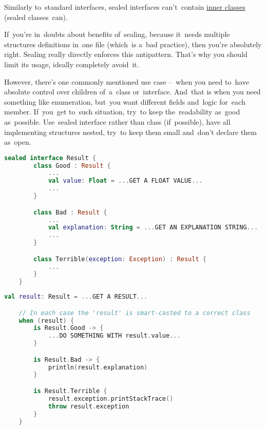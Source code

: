 \warning Similarly to~standard interfaces, sealed interfaces can't~contain \hyperref[kotlininnerclass]{inner classes} (sealed classes~can).

If~you're in~doubts about benefits of~sealing, because it~needs multiple structures definitions in~one file (which~is a~bad practice), then you're absolutely right.
Sealing really directly enforces this antipattern.
That's why you should limit its usage, ideally completely avoid~it.

However, there's one commonly mentioned use case --~when you need to~have absolute control over children of~a~class or~interface.
And~that is when you need something like enumeration, but~you want different fields and~logic for~each member.
If~you~get to~such situation, try~to keep the~readability as~good as~possible.
Use~sealed interface rather than class (if~possible), have all implementing structures nested, try~to keep them small and~don't declare them as~open.
\newpage

\example
\begin{lstlisting}[language=Kotlin, title={Sealed interface representing a~result}]
    sealed interface Result {
        class Good : Result {
            ...
            val value: Float = ...GET A FLOAT VALUE...
            ...
        }

        class Bad : Result {
            ...
            val explanation: String = ...GET AN EXPLANATION STRING...
            ...
        }

        class Terrible(exception: Exception) : Result {
            ...
        }
    }
\end{lstlisting}
\begin{lstlisting}[language=Kotlin, title={Usage}]
    val result: Result = ...GET A RESULT...

    // In each case the 'result' is smart-casted to a correct class
    when (result) {
        is Result.Good -> {
            ...DO SOMETHING WITH result.value...
        }

        is Result.Bad -> {
            println(result.explanation)
        }

        is Result.Terrible {
            result.exception.printStackTrace()
            throw result.exception
        }
    }
\end{lstlisting}
\newpage
